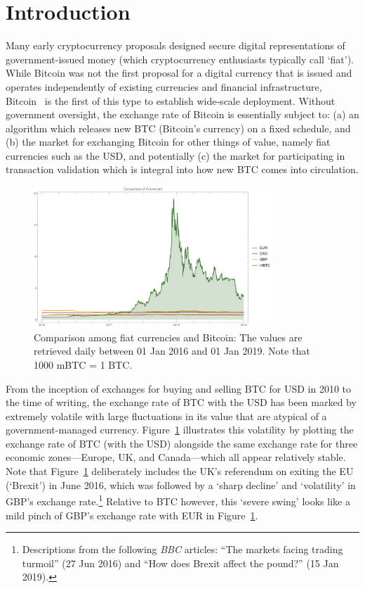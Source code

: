 
\section{Introduction}\label{sec:Intro}

Many early cryptocurrency proposals designed secure digital representations of government-issued money (which cryptocurrency enthusiasts typically call `fiat'). While Bitcoin was not the first proposal for a digital currency that is issued and operates independently of existing currencies and financial infrastructure, Bitcoin~\cite{nakamoto2008bitcoin} is the first of this type to establish wide-scale deployment. Without government oversight, the exchange rate of Bitcoin is essentially subject to: (a) an algorithm which releases new BTC (Bitcoin's currency) on a fixed schedule, and (b) the market for exchanging Bitcoin for other things of value, namely fiat currencies such as the USD, and potentially (c) the market for participating in transaction validation which is integral into how new BTC comes into circulation.

\begin{figure}[t]
	\centering
	\includegraphics[width=0.8\textwidth]{figures/allCurrencies.pdf}
	\caption{\label{fig:btcandfiat}Comparison among fiat currencies and Bitcoin: The values are retrieved daily between  01 Jan 2016 and 01 Jan 2019. Note that 1000 mBTC = 1 BTC.}
\end{figure}

From the inception of exchanges for buying and selling BTC for USD in 2010 to the time of writing, the exchange rate of BTC with the USD has been marked by extremely volatile with large fluctuations in its value that are atypical of a government-managed currency. Figure~\ref{fig:btcandfiat} illustrates this volatility by plotting the exchange rate of BTC (with the USD) alongside the same exchange rate for three economic zones---Europe, UK, and Canada---which all appear relatively stable. Note that Figure~\ref{fig:btcandfiat} deliberately includes the UK's referendum on exiting the EU (`Brexit') in June 2016, which was followed by a `sharp decline' and `volatility' in GBP's exchange rate.\footnote{Descriptions from the following \textit{BBC} articles: ``The markets facing trading turmoil'' (27 Jun 2016) and ``How does Brexit affect the pound?'' (15 Jan 2019).}  Relative to BTC however, this `severe swing' looks like a mild pinch of GBP's exchange rate with EUR in Figure~\ref{fig:btcandfiat}.

